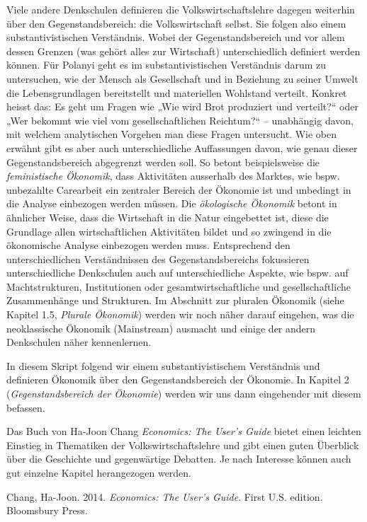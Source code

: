\documentclass[
  nswissgerman,
  a4paper,
  DIV=11,
  numbers=noendperiod,
  oneside,
  openany]{scrreprt}
\begin{document}
Viele andere Denkschulen definieren die Volkswirtschaftslehre dagegen
weiterhin über den Gegenstandsbereich: die Volkswirtschaft selbst. Sie
folgen also einem substantivistischen Verständnis. Wobei der
Gegenstandsbereich und vor allem dessen Grenzen (was gehört alles zur
Wirtschaft) unterschiedlich definiert werden können. Für Polanyi geht es
im substantivistischen Verständnis darum zu untersuchen, wie der Mensch
als Gesellschaft und in Beziehung zu seiner Umwelt die Lebensgrundlagen
bereitstellt und materiellen Wohlstand verteilt. Konkret heisst das: Es
geht um Fragen wie „Wie wird Brot produziert und verteilt?{\kern0pt}``
oder „Wer bekommt wie viel vom gesellschaftlichen Reichtum?{\kern0pt}``
-- unabhängig davon, mit welchem analytischen Vorgehen man diese Fragen
untersucht. Wie oben erwähnt gibt es aber auch unterschiedliche
Auffassungen davon, wie genau dieser Gegenstandsbereich abgegrenzt
werden soll. So betont beispielsweise die \emph{feministische Ökonomik},
dass Aktivitäten ausserhalb des Marktes, wie bspw. unbezahlte Carearbeit
ein zentraler Bereich der Ökonomie ist und unbedingt in die Analyse
einbezogen werden müssen. Die \emph{ökologische Ökonomik} betont in
ähnlicher Weise, dass die Wirtschaft in die Natur eingebettet ist, diese
die Grundlage allen wirtschaftlichen Aktivitäten bildet und so zwingend
in die ökonomische Analyse einbezogen werden muss. Entsprechend den
unterschiedlichen Verständnissen des Gegenstandsbereichs fokussieren
unterschiedliche Denkschulen auch auf unterschiedliche Aspekte, wie
bspw. auf Machtstrukturen, Institutionen oder gesamtwirtschaftliche und
gesellschaftliche Zusammenhänge und Strukturen. Im Abschnitt zur
pluralen Ökonomik (siehe Kapitel 1.5, \emph{Plurale Ökonomik}) werden
wir noch näher darauf eingehen, was die neoklassische Ökonomik
(Mainstream) ausmacht und einige der andern Denkschulen näher
kennenlernen.

In diesem Skript folgend wir einem substantivistischem Verständnis und
definieren Ökonomik über den Gegenstandsbereich der Ökonomie. In Kapitel
2 (\emph{Gegenstandsbereich der Ökonomie}) werden wir uns dann
eingehender mit diesem befassen.

\begin{tcolorbox}[enhanced jigsaw, arc=.35mm, bottomrule=.15mm, bottomtitle=1mm, breakable, colback=white, colbacktitle=quarto-callout-caution-color!10!white, colframe=quarto-callout-caution-color-frame, coltitle=black, left=2mm, leftrule=.75mm, opacityback=0, opacitybacktitle=0.6, rightrule=.15mm, title={Weiterführende Literatur}, titlerule=0mm, toprule=.15mm, toptitle=1mm]

Das Buch von Ha-Joon Chang \emph{Economics: The User's Guide} bietet
einen leichten Einstieg in Thematiken der Volkswirtschaftslehre und gibt
einen guten Überblick über die Geschichte und gegenwärtige Debatten. Je
nach Interesse können auch gut einzelne Kapitel herangezogen werden.

Chang, Ha-Joon. 2014. \emph{Economics: The User's Guide}. First U.S.
edition. Bloomsbury Press.

\end{tcolorbox}
\end{document}
